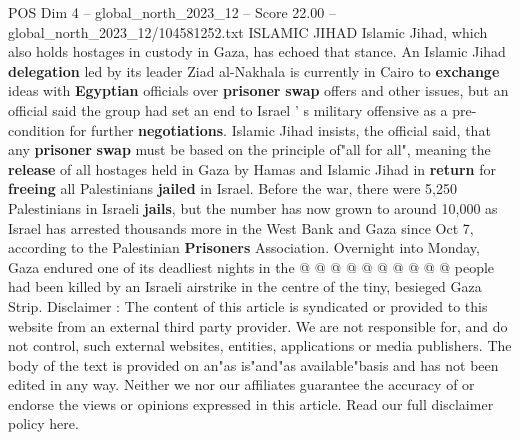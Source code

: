 \begin{textsample}{POS Dim 4 – global\_north\_2023\_12 – Score 22.00 – global\_north\_2023\_12/104581252.txt}
ISLAMIC JIHAD Islamic Jihad, which also holds hostages in custody in Gaza, has echoed that stance.
An Islamic Jihad \textbf{delegation} led by its leader Ziad al-Nakhala is currently in Cairo to \textbf{exchange} ideas with \textbf{Egyptian} officials over \textbf{prisoner} \textbf{swap} offers and other issues, but an official said the group had set an end to Israel ' s military offensive as a pre-condition for further \textbf{negotiations}.
Islamic Jihad insists, the official said, that any \textbf{prisoner} \textbf{swap} must be based on the principle of"all for all", meaning the \textbf{release} of all hostages held in Gaza by Hamas and Islamic Jihad in \textbf{return} for \textbf{freeing} all Palestinians \textbf{jailed} in Israel.
Before the war, there were 5,250 Palestinians in Israeli \textbf{jails}, but the number has now grown to around 10,000 as Israel has arrested thousands more in the West Bank and Gaza since Oct 7, according to the Palestinian \textbf{Prisoners} Association.
Overnight into Monday, Gaza endured one of its deadliest nights in the @ @ @ @ @ @ @ @ @ @ people had been killed by an Israeli airstrike in the centre of the tiny, besieged Gaza Strip.
Disclaimer : The content of this article is syndicated or provided to this website from an external third party provider.
We are not responsible for, and do not control, such external websites, entities, applications or media publishers.
The body of the text is provided on an"as is"and"as available"basis and has not been edited in any way.
Neither we nor our affiliates guarantee the accuracy of or endorse the views or opinions expressed in this article.
Read our full disclaimer policy here.

\end{textsample}
